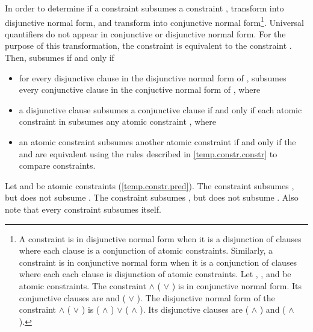 \pnum
In order to determine if a constraint  subsumes a constraint
, transform  into disjunctive normal form, 
and transform  into conjunctive normal form\footnote{
A constraint is in disjunctive normal form when it is a disjunction of
clauses where each clause is a conjunction of atomic constraints. 
% 
Similarly, a constraint is in conjunctive normal form when it is a conjunction 
of clauses where each each clause is disjunction of atomic constraints.
% 
\enterexample
Let , , and  be atomic constraints.
% 
The constraint  $\land$ ( $\lor$ ) is in 
conjunctive normal form.
% 
Its conjunctive clauses are  and ( $\lor$ ).
% 
The disjunctive normal form of the constraint
 $\land$ ( $\lor$ ) 
is
( $\land$ ) $\lor$ ( $\land$ ).
% 
Its disjunctive clauses are ( $\land$ ) and 
( $\land$ ).
\exitexample
}.
% 
Universal quantifiers do not appear in conjunctive or disjunctive normal
form. For the purpose of this transformation, the constraint
 is equivalent to the constraint .
% 
Then,  subsumes  if and only if
\begin{itemize}
\item for every disjunctive clause  in the disjunctive normal 
form of ,  subsumes every conjunctive clause  
in the conjuctive normal form of , where

\item a disjunctive clause  subsumes a conjunctive clause
 if and only if each atomic constraint in  subsumes 
any atomic constraint , where

\item an atomic constraint  subsumes another atomic constraint
 if and only if the  and  are equivalent using the
rules described in \ref{temp.constr.constr} to compare constraints.
\end{itemize}
% 
\enterexample
Let  and  be atomic constraints (\ref{temp.constr.pred}).
% 
The constraint  subsumes , 
but  does not subsume . 
% 
The constraint  subsumes , but
 does not subsume . 
% 
Also note that every constraint subsumes itself.
\exitexample


